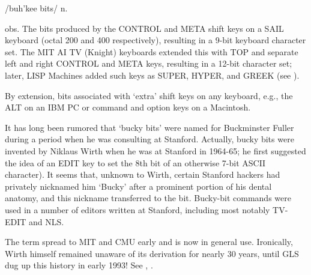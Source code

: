  /buh'kee bits/ n.

\begin{inparaenum}
\item obs. The bits produced by the CONTROL and META shift keys on a SAIL
    keyboard (octal 200 and 400 respectively), resulting in a 9-bit keyboard
    character set. The MIT AI TV (Knight) keyboards extended this with TOP and
    separate left and right CONTROL and META keys, resulting in a 12-bit
    character set; later, LISP Machines added such keys as SUPER, HYPER, and
    GREEK (see ).
\item By extension, bits associated with `extra' shift keys on any keyboard,
    e.g., the ALT on an IBM PC or command and option keys on a Macintosh.
\end{inparaenum}

It has long been rumored that `bucky bits' were named for Buckminster Fuller
during a period when he was consulting at Stanford. Actually, bucky bits were
invented by Niklaus Wirth when he was at Stanford in 1964-65; he first suggested
the idea of an EDIT key to set the 8th bit of an otherwise 7-bit ASCII
character). It seems that, unknown to Wirth, certain Stanford hackers had
privately nicknamed him `Bucky' after a prominent portion of his dental anatomy,
and this nickname transferred to the bit. Bucky-bit commands were used in a
number of editors written at Stanford, including most notably TV-EDIT and NLS.

The term spread to MIT and CMU early and is now in general use. Ironically,
Wirth himself remained unaware of its derivation for nearly 30 years, until GLS
dug up this history in early 1993! See ,
.

